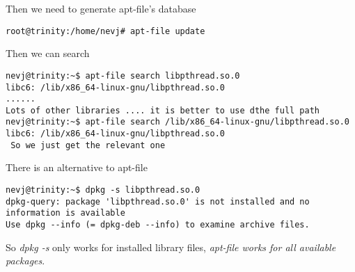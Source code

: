 \documentclass[a4paper]{article}  %
\begin{document}
Then we need to generate apt-file's database
\begin{tcolorbox}
\begin{verbatim}
root@trinity:/home/nevj# apt-file update
\end{verbatim}
\end{tcolorbox}
Then we can search 
\begin{tcolorbox}
\begin{verbatim}
nevj@trinity:~$ apt-file search libpthread.so.0
libc6: /lib/x86_64-linux-gnu/libpthread.so.0
......
Lots of other libraries .... it is better to use dthe full path
nevj@trinity:~$ apt-file search /lib/x86_64-linux-gnu/libpthread.so.0
libc6: /lib/x86_64-linux-gnu/libpthread.so.0
 So we just get the relevant one
\end{verbatim}
\end{tcolorbox}


There is an alternative to apt-file
\begin{tcolorbox}
\begin{verbatim}
nevj@trinity:~$ dpkg -s libpthread.so.0
dpkg-query: package 'libpthread.so.0' is not installed and no information is available
Use dpkg --info (= dpkg-deb --info) to examine archive files.
\end{verbatim}
\end{tcolorbox}
 So {\em dpkg -s} only works for installed library files, {\em apt-file works for all available packages}.
\end{document}
